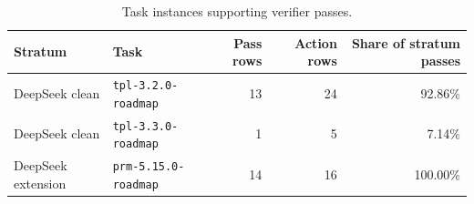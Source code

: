 
\begin{table}[H]
\centering
\caption{Task instances supporting verifier passes.}
\label{tab:positive-tasks}
\small
\begin{tabular}{@{}llrrr@{}}
\toprule
Stratum & Task & Pass rows & Action rows & Share of stratum passes \\
\midrule
DeepSeek clean & \texttt{tpl-3.2.0-roadmap} & 13 & 24 & 92.86\% \\
DeepSeek clean & \texttt{tpl-3.3.0-roadmap} & 1 & 5 & 7.14\% \\
DeepSeek extension & \texttt{prm-5.15.0-roadmap} & 14 & 16 & 100.00\% \\
\bottomrule
\end{tabular}
\end{table}
